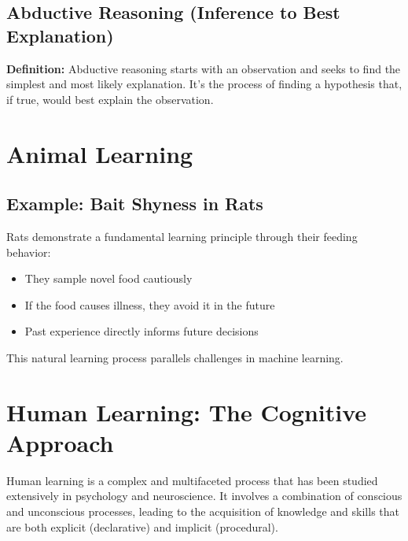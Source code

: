 \subsection{Abductive Reasoning (Inference to Best Explanation)}
\textbf{Definition:} Abductive reasoning starts with an observation and seeks to find the simplest and most likely explanation. It's the process of finding a hypothesis that, if true, would best explain the observation.

\section{Animal Learning}
\subsection{Example: Bait Shyness in Rats}
Rats demonstrate a fundamental learning principle through their feeding behavior:
\begin{itemize}
    \item They sample novel food cautiously
    \item If the food causes illness, they avoid it in the future
    \item Past experience directly informs future decisions
\end{itemize}
This natural learning process parallels challenges in machine learning.

\section{Human Learning: The Cognitive Approach}
Human learning is a complex and multifaceted process that has been studied extensively in psychology and neuroscience. It involves a combination of conscious and unconscious processes, leading to the acquisition of knowledge and skills that are both explicit (declarative) and implicit (procedural).

